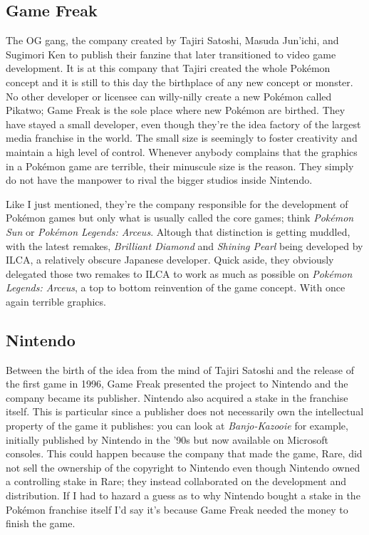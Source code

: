 \documentclass{book}
\begin{document}
\subsection*{Game Freak}\nopagebreak[4]

The OG gang, the company created by Tajiri Satoshi, Masuda Jun’ichi, and Sugimori Ken to publish their fanzine that later transitioned to video game development. It is at this company that Tajiri created the whole Pokémon concept and it is still to this day the birthplace of any new concept or monster. No other developer or licensee can willy-nilly create a new Pokémon called Pikatwo; Game Freak is the sole place where new Pokémon are birthed. They have stayed a small developer, even though they’re the idea factory of the largest media franchise in the world. The small size is seemingly to foster creativity and maintain a high level of control. Whenever anybody complains that the graphics in a Pokémon game are terrible, their minuscule size is the reason. They simply do not have the manpower to rival the bigger studios inside Nintendo.

Like I just mentioned, they’re the company responsible for the development of Pokémon games but only what is usually called the core games; think \emph{Pokémon Sun} or \emph{Pokémon Legends: Arceus}. Altough that distinction is getting muddled, with the latest remakes, \emph{Brilliant Diamond} and \emph{Shining Pearl} being developed by ILCA, a relatively obscure Japanese developer. Quick aside, they obviously delegated those two remakes to ILCA to work as much as possible on \emph{Pokémon Legends: Arceus}, a top to bottom reinvention of the game concept. With once again terrible graphics.

\subsection*{Nintendo}\nopagebreak[4]

Between the birth of the idea from the mind of Tajiri Satoshi and the release of the first game in 1996, Game Freak presented the project to Nintendo and the company became its publisher. Nintendo also acquired a stake in the franchise itself. This is particular since a publisher does not necessarily own the intellectual property of the game it publishes: you can look at \emph{Banjo-Kazooie} for example, initially published by Nintendo in the ’90s but now available on Microsoft consoles. This could happen because the company that made the game, Rare, did not sell the ownership of the copyright to Nintendo even though Nintendo owned a controlling stake in Rare; they instead collaborated on the development and distribution. If I had to hazard a guess as to why Nintendo bought a stake in the Pokémon franchise itself I’d say it’s because Game Freak needed the money to finish the game.
\end{document}
